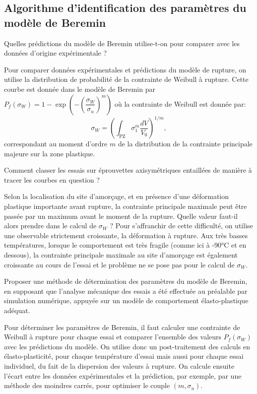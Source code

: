 \begin{questions}
\subsection{Algorithme d’identification des paramètres du modèle de Beremin}

\question Quelles prédictions du modèle de Beremin utilise-t-on pour comparer avec les données
d’origine expérimentale ?
\begin{solution}
Pour comparer données expérimentales et prédictions du modèle de rupture, on utilise la
distribution de probabilité de la contrainte de Weibull à rupture. Cette courbe est donnée dans
le modèle de Beremin par $P_f(\sigma_W) = 1-\exp\left(-\left(\dfrac{\sigma_W}{\sigma_u}\right)^m\right)$ où la contrainte de Weibull est donnée par:
$$\sigma_W = \left(\int_{\text{PZ}} \sigma_1^m \dfrac{dV}{V_0} \right)^{1/m},$$
correspondant au moment d'ordre $m$ de la distribution de la contrainte principale majeure sur la zone plastique.
\end{solution}
\question Comment classer les essais sur éprouvettes axisymétriques entaillées de manière à tracer les
courbes en question ?
\begin{solution}
Selon la localisation du site d’amorçage, et en présence d’une déformation plastique importante avant rupture, la contrainte principale maximale peut être passée par un maximum avant le moment de la rupture. Quelle valeur faut-il alors prendre dans le calcul de $\sigma_W$ ? Pour s’affranchir de cette difficulté, on utilise une observable strictement croissante, la déformation à rupture. Aux très basses températures, lorsque le comportement est très fragile (comme ici à -90°C et en dessous), la contrainte principale maximale au site d’amorçage est également croissante au cours de l’essai et le problème ne se pose pas pour le calcul de $\sigma_W$.
\end{solution}

\question Proposer une méthode de détermination des paramètres du modèle de Beremin, en supposant
que l’analyse mécanique des essais a été effectuée au préalable par simulation numérique,
appuyée sur un modèle de comportement élasto-plastique adéquat.

\begin{solution}
Pour déterminer les paramètres de Beremin, il faut calculer une contrainte de Weibull à rupture pour chaque essai et comparer l’ensemble des valeurs $P_f(\sigma_W)$ avec les prédictions du modèle. On utilise donc un post-traitement des calculs en élasto-plasticité, pour chaque température d’essai mais aussi pour chaque essai individuel, du fait de la dispersion des valeurs à rupture. On calcule ensuite l’écart entre les données expérimentales et la prédiction, par exemple, par une méthode des moindres carrés, pour optimiser le couple $(m,\sigma_u)$.
\end{solution}


\end{questions}
